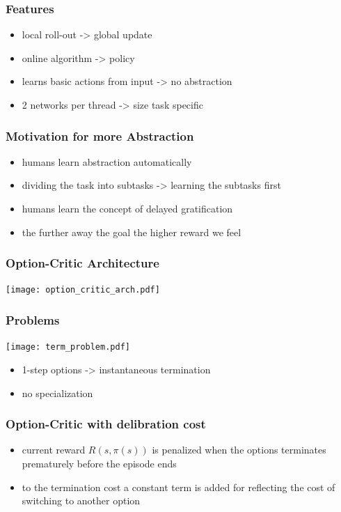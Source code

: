 \documentclass{beamer}
\begin{document}
\begin{frame}[fragile]
\frametitle{Features}
\begin{itemize}
\item local roll-out \pause \qquad -> global update \pause
\item online algorithm  \pause \qquad -> policy \pause
\item learns basic actions from input \pause \qquad  -> no abstraction \pause
\item 2 networks per thread \pause \qquad -> size task specific
\end{itemize}
\end{frame}



\begin{frame}[fragile]
\frametitle{Motivation for more Abstraction}
\begin{itemize}
\item humans learn abstraction automatically \pause
\item dividing the task into subtasks \pause -> learning the subtasks first  \pause
\item humans learn the concept of delayed gratification \pause
\item the further away the goal the higher reward we feel \footnotemark
\end{itemize}
\end{frame}

\begin{frame}[fragile]
\frametitle{Option-Critic Architecture\footnotemark \cite{bacon2017option}}
\texttt{[image: option\_critic\_arch.pdf]}
\end{frame}


\begin{frame}[fragile]
\frametitle{Problems}
\texttt{[image: term\_problem.pdf]}
\begin{itemize}
\item 1-step options \pause \qquad -> instantaneous termination \pause
\item no specialization
\end{itemize}
\end{frame}


\begin{frame}
\frametitle{Option-Critic with delibration cost \cite{harb2017waiting}}
\begin{itemize}
\item current reward $R(s,\pi(s))$ is penalized when the options terminates prematurely before the episode ends \pause
\item to the termination cost a constant term is added for reflecting the cost of switching to another option
\end{itemize}
\end{frame}
\end{document}
